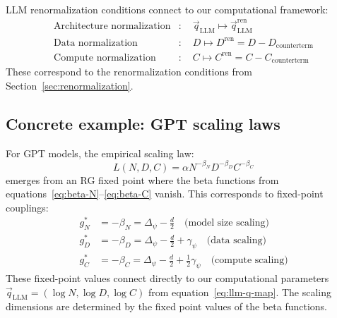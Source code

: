 \begin{definition}
\label{def:llm-renorm-conditions}
LLM renormalization conditions connect to our computational framework:
\begin{align}
\text{Architecture normalization} &: \quad \vec{q}_{\text{LLM}} \mapsto \vec{q}_{\text{LLM}}^{\text{ren}} \label{eq:llm-arch-renorm} \\
\text{Data normalization} &: \quad D \mapsto D^{\text{ren}} = D - D_{\text{counterterm}} \label{eq:llm-data-renorm} \\
\text{Compute normalization} &: \quad C \mapsto C^{\text{ren}} = C - C_{\text{counterterm}} \label{eq:llm-comp-renorm}
\end{align}
These correspond to the renormalization conditions from Section~\ref{sec:renormalization}.
\end{definition}

\subsection{Concrete example: GPT scaling laws}

\begin{example}
\label{ex:gpt_rg_fixed_point}
For GPT models, the empirical scaling law:
\begin{equation}
  L(N,D,C) = \alpha N^{-\beta_N} D^{-\beta_D} C^{-\beta_C}
  \label{eq:gpt_scaling}
\end{equation}
emerges from an RG fixed point where the beta functions from equations~\eqref{eq:beta-N}--\eqref{eq:beta-C} vanish. This corresponds to fixed-point couplings:
\begin{align}
  g_N^* &= -\beta_N = \Delta_\psi - \frac{d}{2} \quad \text{(model size scaling)} \label{eq:gpt-gn} \\
  g_D^* &= -\beta_D = \Delta_\psi - \frac{d}{2} + \gamma_\psi \quad \text{(data scaling)} \label{eq:gpt-gd} \\
  g_C^* &= -\beta_C = \Delta_\psi - \frac{d}{2} + \frac{1}{2}\gamma_\psi \quad \text{(compute scaling)} \label{eq:gpt-gc}
\end{align}
These fixed-point values connect directly to our computational parameters $\vec{q}_{\text{LLM}} = (\log N, \log D, \log C)$ from equation~\eqref{eq:llm-q-map}.
The scaling dimensions are determined by the fixed point values of the beta functions.
\end{example}


